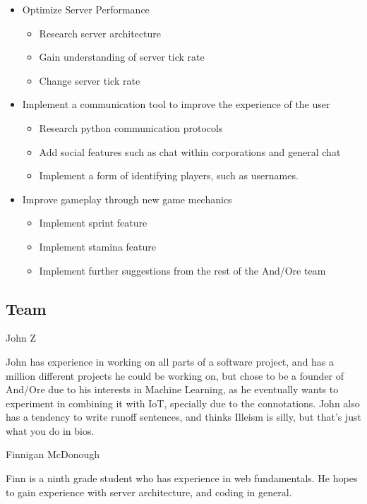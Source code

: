 \documentclass[11pt]{article}
\begin{document}
\begin{itemize}
	\item Optimize Server Performance
		\begin{itemize}
			\item Research server architecture
			\item Gain understanding of server tick rate
			\item Change server tick rate
		\end{itemize}
	\item Implement a communication tool to improve the experience of the user
		\begin{itemize}
			\item Research python communication protocols
			\item Add social features such as chat within corporations and general chat
			\item Implement a form of identifying players, such as usernames.
		\end{itemize}
	\item Improve gameplay through new game mechanics
		\begin{itemize}
			\item Implement sprint feature
			\item Implement stamina feature
			\item Implement further suggestions from the rest of the And/Ore team
		\end{itemize}
\end{itemize}

\subsection{{\color{blue}Team}}

{\large {\color{orange}John Z}}

John has experience in working on all parts of a software project, and has a million different projects he could be working on, but chose to be a founder of And/Ore due to his interests in Machine Learning, as he eventually wants to experiment in combining it with IoT, specially due to the connotations. John also has a tendency to write runoff sentences, and thinks Illeism is silly, but that's just what you do in bios.


{\large {\color{orange}Finnigan McDonough}}

Finn is a ninth grade student who has experience in web fundamentals. He hopes to gain experience with server architecture, and coding in general.
\end{document}

